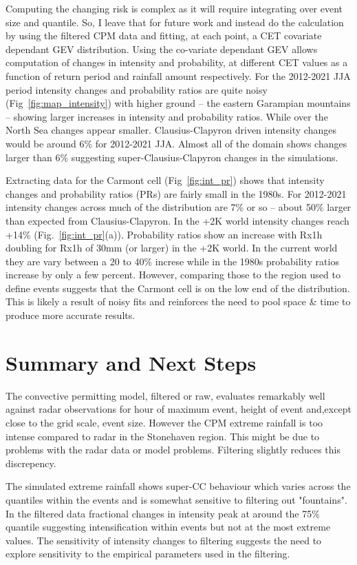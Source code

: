 \documentclass[11pt,a4paper]{article}
\begin{document}
Computing the changing risk is complex as it will require integrating over event size and quantile. So, I leave that for future work  and instead do the  calculation by using the  filtered CPM data and fitting, at each point, a CET covariate dependant GEV distribution.  Using the co-variate dependant GEV allows computation of changes in intensity and probability, at different CET values as a function of return period and  rainfall amount respectively. For the 2012-2021 JJA period intensity changes and probability ratios are quite noisy (Fig~\ref{fig:map_intensity}) with higher ground -- the eastern Garampian mountains  -- showing larger increases in intensity and probability ratios. While over the North Sea changes appear smaller. Clausius-Clapyron driven intensity changes would be around 6\% for 2012-2021 JJA. Almost all of the domain shows changes larger than 6\% suggesting super-Clausius-Clapyron changes in the simulations. 

Extracting data for the Carmont cell (Fig~\ref{fig:int_pr}) shows that intensity changes and probability ratios (PRs) are fairly small in the 1980s. For 2012-2021 intensity changes across much of the distribution are 7\% or so -- about 50\% larger than expected from Clausius-Clapyron. In the +2K world intensity changes reach +14\% (Fig.~\ref{fig:int_pr}(a)). Probability ratios show an increase with Rx1h 
doubling for Rx1h of 30mm (or larger) in the +2K world. In the current world they are vary between a  20 to 40\% increse while in the 1980s probability ratios increase by only a few percent.  However, comparing those to the region used to define events suggests that the Carmont cell is on the low end of the distribution. This is likely a result of noisy fits and reinforces the need to pool space \& time to produce more accurate results. 



\section{Summary and Next Steps}
The convective permitting model, filtered or raw, evaluates remarkably well against radar observations for hour of maximum event, height of event and,except close to the grid scale, event size. However the CPM extreme rainfall is too intense compared to radar in the Stonehaven region. This might be due to problems with the radar data or model problems.  Filtering slightly reduces this discrepency. 

The simulated extreme rainfall shows super-CC behaviour  which varies across the quantiles within the events and is somewhat sensitive to filtering out "fountains". In the filtered data fractional changes in intensity peak at around the 75\% quantile suggesting intensification within events but not at the most extreme values. The sensitivity of intensity changes to filtering suggests the need to explore sensitivity to the empirical parameters used in the filtering.
 
\end{document}
